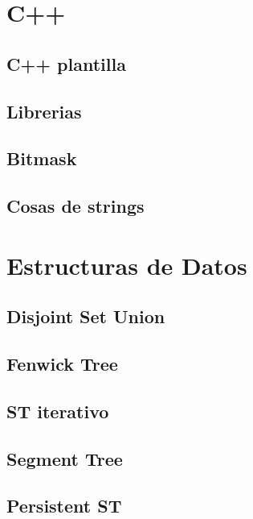\section{C++}
\subsection{C++ plantilla}
\raggedbottom
\hrulefill
\subsection{Librerias}
\raggedbottom
\hrulefill
\subsection{Bitmask}
\raggedbottom
\hrulefill
\subsection{Cosas de strings}
\raggedbottom
\hrulefill

\section{Estructuras de Datos}
\subsection{Disjoint Set Union}
\raggedbottom
\hrulefill
\subsection{Fenwick Tree}
\raggedbottom
\hrulefill
\subsection{ST iterativo}
\raggedbottom
\hrulefill
\subsection{Segment Tree}
\raggedbottom
\hrulefill
\subsection{Persistent ST}
\raggedbottom
\hrulefill
